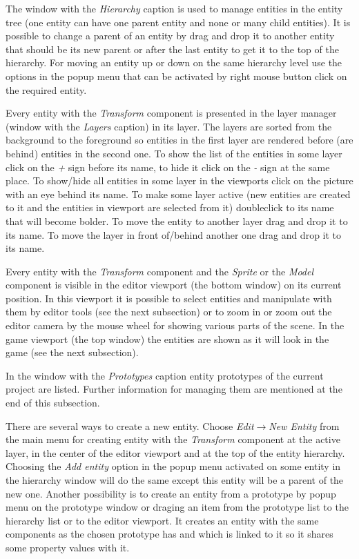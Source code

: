 The window with the \emph{Hierarchy} caption is used to manage entities in the entity tree (one entity can have one parent entity and none or many child entities). It is possible to change a parent of an entity by drag and drop it to another entity that should be its new parent or after the last entity to get it to the top of the hierarchy. For moving an entity up or down on the same hierarchy level use the options in the popup menu that can be activated by right mouse button click on the required entity.

Every entity with the \emph{Transform} component is presented in the layer manager (window with the \emph{Layers} caption) in its layer. The layers are sorted from the background to the foreground so entities in the first layer are rendered before (are behind) entities in the second one. To show the list of the entities in some layer click on the \emph{+} sign before its name, to hide it click on the \emph{-} sign at the same place. To show/hide all entities in some layer in the viewports click on the picture with an eye behind its name. To make some layer active (new entities are created to it and the entities in viewport are selected from it) doubleclick to its name that will become bolder. To move the entity to another layer drag and drop it to its name. To move the layer in front of/behind another one drag and drop it to its name.

Every entity with the \emph{Transform} component and the \emph{Sprite} or the \emph{Model} component is visible in the editor viewport (the bottom window) on its current position. In this viewport it is possible to select entities and manipulate with them by editor tools (see the next subsection) or to zoom in or zoom out the editor camera by the mouse wheel for showing various parts of the scene. In the game viewport (the top window) the entities are shown as it will look in the game (see the next subsection).

In the window with the \emph{Prototypes} caption entity prototypes of the current project are listed. Further information for managing them are mentioned at the end of this subsection.

There are several ways to create a new entity. Choose \emph{Edit}$\rightarrow$\emph{New Entity} from the main menu for creating entity with the \emph{Transform} component at the active layer, in the center of the editor viewport and at the top of the entity hierarchy. Choosing the \emph{Add entity} option in the popup menu activated on some entity in the hierarchy window will do the same except this entity will be a parent of the new one. Another possibility is to create an entity from a prototype by popup menu on the prototype window or draging an item from the prototype list to the hierarchy list or to the editor viewport. It creates an entity with the same components as the chosen prototype has and which is linked to it so it shares some property values with it.

